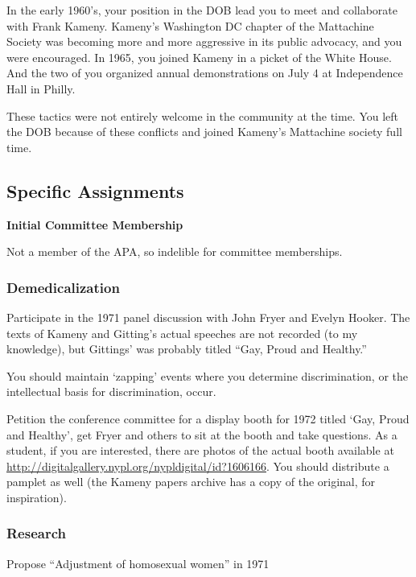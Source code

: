 \begin{refsection}
In the early 1960's, your position in the DOB lead you to meet and collaborate with Frank Kameny. Kameny's Washington DC chapter of the Mattachine Society was becoming more and more aggressive in its public advocacy, and you were encouraged. In 1965, you joined Kameny in a picket of the White House. And the two of you organized annual demonstrations on July 4 at Independence Hall in Philly.

These tactics were not entirely welcome in the community at the time. You left the DOB because of these conflicts and joined Kameny's Mattachine society full time.

\subsection{Specific Assignments}
\label{specificassignments}

\textbf{Initial Committee Membership}

Not a member of the APA, so indelible for committee memberships.

\subsubsection{Demedicalization}
\label{demedicalization}

Participate in the 1971 panel discussion with John Fryer and Evelyn Hooker. The texts of Kameny and Gitting's actual speeches are not recorded (to my knowledge), but Gittings' was probably titled “Gay, Proud and Healthy.” 

You should maintain `zapping' events where you determine discrimination, or the intellectual basis for discrimination, occur.

Petition the conference committee for a display booth for 1972 titled `Gay, Proud and Healthy', get Fryer and others to sit at the booth and take questions. As a student, if you are interested, there are photos of the actual booth available at \url{http://digitalgallery.nypl.org/nypldigital/id?1606166}. You should distribute a pamplet as well (the Kameny papers archive has a copy of the original, for inspiration).

\subsubsection{Research}
\label{research}

\begin{researchtask}[Gittings]\label{researchtask:gittings}
Propose “Adjustment of homosexual women” in 1971
\end{researchtask}


\end{refsection}
